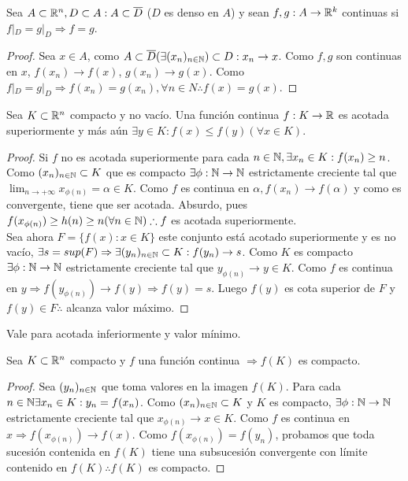 \clearpage

\begin{prop}
  Sea \(A \subset \mathbb{R}^n, D \subset A : A \subset \overline{D}\) (\(D\) es denso en \(A\)) y sean \(f, g : A \to \mathbb{R}^k\) continuas si \(f|_D = g|_D \Rightarrow f=g\).

  \begin{proof}
    Sea \(x \in A\), como \(A \subset \overline{D} (\exists (x_n)_{n \in \mathbb{N}}) \subset D : x_n \to x\). Como \(f, g\) son continuas en \(x\), \(f(x_n) \to f(x)\), \(g(x_n) \to g(x)\). Como \(f|_D = g|_D \Rightarrow f(x_n) = g(x_n), \forall n \in N \therefore f(x) = g(x)\).
  \end{proof}
\end{prop}

\begin{theorem}[Weiertrass]
  Sea \(K \subset \mathbb{R}^n\) compacto y no vacío. Una función continua \(f: K \to \mathbb{R}\) es acotada superiormente y más aún \(\exists y \in K : f(x) \leq f(y) (\forall x \in K)\).
  \begin{proof}
    Si \(f\) no es acotada superiormente para cada \(n \in \mathbb{N}, \exists x_n \in K : f(x_n) \geq n\). Como \((x_n)_{n \in \mathbb{N}} \subset K\) que es compacto \(\exists \phi: \mathbb{N} \to \mathbb{N}\) estrictamente creciente tal que \(\lim_{n \to +\infty} x_{\phi(n)} = \alpha \in K\). Como \(f\) es continua en \(\alpha, f(x_n) \to f(\alpha)\) y como es convergente, tiene que ser acotada. Absurdo, pues \(f(x_{\phi(n)}) \geq h(n) \geq n (\forall n \in \mathbb{N}) \therefore f\) es acotada superiormente. \\
    Sea ahora \(F = \{ f(x) : x \in K\}\) este conjunto está acotado superiormente y es no vacío, \(\exists s = sup(F) \Rightarrow \exists (y_n)_{n \in \mathbb{N}} \subset K : f(y_n) \to s\). Como \(K\) es compacto \(\exists \phi : \mathbb{N} \to \mathbb{N}\) estrictamente creciente tal que \(y_{\phi(n)} \to y \in K\). Como \(f\) es continua en \(y \Rightarrow f(y_{\phi(n)}) \to f(y) \Rightarrow f(y) = s\). Luego \(f(y)\) es cota superior de \(F\) y \(f(y) \in F \therefore\) alcanza valor máximo.
  \end{proof}
\end{theorem}

\begin{note}
  Vale para acotada inferiormente y valor mínimo.
\end{note}

\begin{theorem}
  Sea \(K \subset \mathbb{R}^n\) compacto y \(f\) una función continua \(\Rightarrow f(K)\) es compacto.
  \begin{proof}
    Sea \((y_n)_{n \in \mathbb{N}}\) que toma valores en la imagen \(f(K)\). Para cada \(n \in \mathbb{N} \exists x_n \in K : y_n = f(x_n)\). Como \((x_n)_{n \in \mathbb{N}} \subset K\) y \(K\) es compacto, \(\exists \phi : \mathbb{N} \to \mathbb{N}\) estrictamente creciente tal que \(x_{\phi(n)} \to x \in K\). Como \(f\) es continua en \(x \Rightarrow f(x_{\phi(n)}) \to f(x)\). Como \(f(x_{\phi(n)}) = f(y_n)\), probamos que toda sucesión contenida en \(f(K)\) tiene una subsucesión convergente con límite contenido en \(f(K) \therefore f(K)\) es compacto.
  \end{proof}
\end{theorem}

